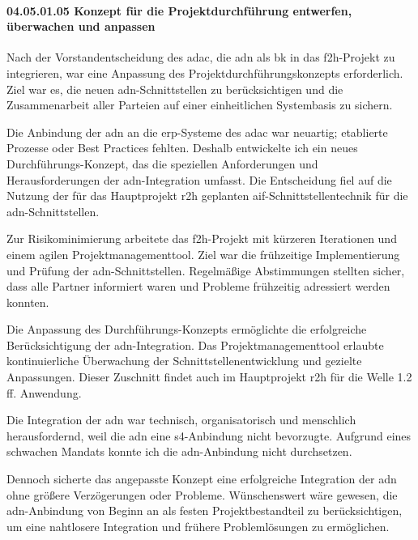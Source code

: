 \paragraph*{04.05.01.05 Konzept für die Projektdurchführung entwerfen, überwachen und anpassen}
\label{para:04.05.01.05_KonzeptFürDieProjektdurchführungEntwerfenÜberwachenUndAnpassen}

\par Nach der Vorstandentscheidung des \gls{adac}, die \gls{adn} als \gls{bk} in das \gls{f2h}-Projekt zu integrieren, war eine Anpassung des Projektdurchführungskonzepts erforderlich. Ziel war es, die neuen \gls{adn}-Schnittstellen zu berücksichtigen und die Zusammenarbeit aller Parteien auf einer einheitlichen Systembasis zu sichern.

\par Die Anbindung der \gls{adn} an die \gls{erp}-Systeme des \gls{adac} war neuartig; etablierte Prozesse oder Best Practices fehlten. Deshalb entwickelte ich ein neues Durchführungs-Konzept, das die speziellen Anforderungen und Herausforderungen der \gls{adn}-Integration umfasst. Die Entscheidung fiel auf die Nutzung der für das Hauptprojekt \gls{r2h} geplanten \gls{aif}-Schnittstellentechnik für die \gls{adn}-Schnittstellen.

\par Zur Risikominimierung arbeitete das \gls{f2h}-Projekt mit kürzeren Iterationen und einem agilen Projektmanagementtool. Ziel war die frühzeitige Implementierung und Prüfung der \gls{adn}-Schnittstellen. Regelmäßige Abstimmungen stellten sicher, dass alle Partner informiert waren und Probleme frühzeitig adressiert werden konnten.

\par Die Anpassung des Durchführungs-Konzepts ermöglichte die erfolgreiche Berücksichtigung der \gls{adn}-Integration. Das Projektmanagementtool erlaubte kontinuierliche Überwachung der Schnittstellenentwicklung und gezielte Anpassungen. Dieser Zuschnitt findet auch im Hauptprojekt \gls{r2h} für die Welle 1.2 ff. Anwendung.

\par Die Integration der \gls{adn} war technisch, organisatorisch und menschlich herausfordernd, weil die \gls{adn} eine \gls{s4}-Anbindung nicht bevorzugte. Aufgrund eines schwachen Mandats konnte ich die \gls{adn}-Anbindung nicht durchsetzen.

\par Dennoch sicherte das angepasste Konzept eine erfolgreiche Integration der \gls{adn} ohne größere Verzögerungen oder Probleme. Wünschenswert wäre gewesen, die \gls{adn}-Anbindung von Beginn an als festen Projektbestandteil zu berücksichtigen, um eine nahtlosere Integration und frühere Problemlösungen zu ermöglichen.